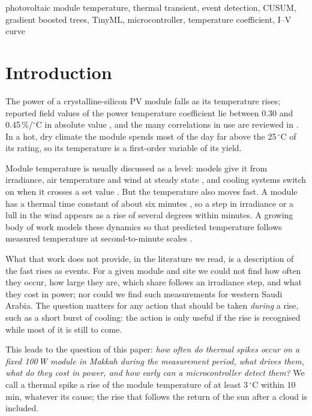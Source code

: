 \documentclass[conference]{IEEEtran}
\newcommand{\degC}{\ensuremath{^\circ}C}
\begin{document}
\begin{IEEEkeywords}
photovoltaic module temperature, thermal transient, event detection, CUSUM, gradient
boosted trees, TinyML, microcontroller, temperature coefficient, I--V curve
\end{IEEEkeywords}

\section{Introduction}
The power of a crystalline-silicon PV module falls as its temperature rises; reported
field values of the power temperature coefficient lie between 0.30 and 0.45\,\%/\degC{}
in absolute value \cite{kaldellis2014}, and the many correlations in use are reviewed in
\cite{skoplaki2009}. In a hot, dry climate the module spends most of the day far above
the 25\,\degC{} of its rating, so its temperature is a first-order variable of its yield.

Module temperature is usually discussed as a level: models give it from irradiance, air
temperature and wind at steady state \cite{king2004,faiman2008}, and cooling systems
switch on when it crosses a set value \cite{moharram2013}. But the temperature also
moves fast. A module has a thermal time constant of about six minutes \cite{herteleer2023},
so a step in irradiance or a lull in the wind appears as a rise of several degrees
within minutes. A growing body of work models these dynamics so that predicted
temperature follows measured temperature at second-to-minute scales
\cite{jones2001,armstrong2010,lobera2013,veldhuis2015,barry2020,prilliman2020,herteleer2023}.

What that work does not provide, in the literature we read, is a description of the
fast rises as events. For a given module and site we could not find how often they
occur, how large they are, which share follows an irradiance step, and what they cost in
power; nor could we find such measurements for western Saudi Arabia. The question
matters for any action that should be taken \emph{during} a rise, such as a short burst
of cooling: the action is only useful if the rise is recognised while most of it is
still to come.

This leads to the question of this paper: \emph{how often do thermal spikes occur on a
fixed 100\,W module in Makkah during the measurement period, what drives them, what do
they cost in power, and how early can a microcontroller detect them?} We call a thermal
spike a rise of the module temperature of at least 3\,\degC{} within 10\,min, whatever
its cause; the rise that follows the return of the sun after a cloud is included.
\end{document}
